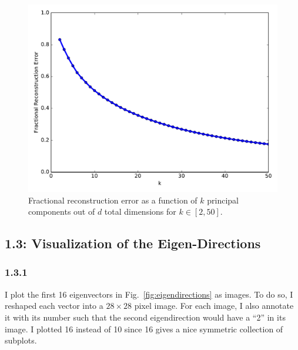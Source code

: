 \documentclass[12pt]{amsart}
\begin{document}
\begin{figure}[H]
	\includegraphics[width=\columnwidth]{fractional_rec_error_sans_mean.pdf}
    \caption{Fractional reconstruction error as a function of $k$ principal components out of $d$ total dimensions for $k \in [2,50]$.}
    \label{fig:frac_rec_error_sans_mean}
\end{figure}

\subsection*{1.3: Visualization of the Eigen-Directions}

\subsubsection*{1.3.1}

I plot the first 16 eigenvectors in Fig.~\ref{fig:eigendirections} as images.  To do so, I reshaped each vector into a $28 \times 28$ pixel image.  For each image, I also annotate it with its number such that the second eigendirection would have a ``2'' in its image.  I plotted 16 instead of 10 since 16 gives a nice symmetric collection of subplots.
\end{document}
